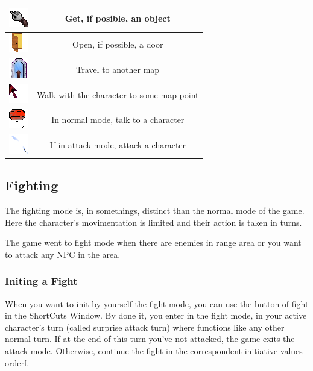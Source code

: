 \documentclass[ letterpaper,12pt]{article}
\begin{document}
\begin{tabular}{|c|c|}
\hline
 \includegraphics{Get.png} & Get, if posible, an object\\
\hline
 \includegraphics{Door.png} & Open, if possible, a door\\
\hline
 \includegraphics{MapTravel.png} & Travel to another map\\
\hline
 \includegraphics{Walk.png} & Walk with the character to some map point\\
\hline
 \includegraphics{talk.png} & In normal mode, talk to a character\\
\hline
 \includegraphics{Attack.png} & If in attack mode, attack a character\\
\hline
\end{tabular}

\subsection{Fighting}

The fighting mode is, in somethings, distinct than the normal mode of the game.
Here the character's movimentation is limited and their action is taken in
turns.

The game went to fight mode when there are enemies in range area or you want to attack any NPC in the area.

\subsubsection{Initing a Fight}

When you want to init by yourself the fight mode, you can use the button of fight in the ShortCuts Window. By done it, you enter in the fight mode, in your active character's turn (called surprise attack turn) where functions like any other normal turn. If at the end of this turn you've not attacked, the game exits the attack mode. Otherwise, continue the fight in the  correspondent initiative values orderf.
\end{document}
